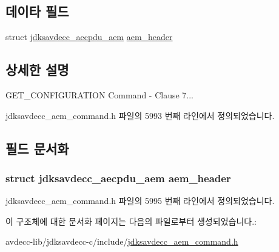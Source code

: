 \subsection*{데이타 필드}
\begin{DoxyCompactItemize}
\item 
struct \hyperlink{structjdksavdecc__aecpdu__aem}{jdksavdecc\+\_\+aecpdu\+\_\+aem} \hyperlink{structjdksavdecc__aem__command__get__configuration_ae1e77ccb75ff5021ad923221eab38294}{aem\+\_\+header}
\end{DoxyCompactItemize}


\subsection{상세한 설명}
G\+E\+T\+\_\+\+C\+O\+N\+F\+I\+G\+U\+R\+A\+T\+I\+ON Command -\/ Clause 7... 

jdksavdecc\+\_\+aem\+\_\+command.\+h 파일의 5993 번째 라인에서 정의되었습니다.



\subsection{필드 문서화}
\subsubsection[{\texorpdfstring{aem\+\_\+header}{aem_header}}]{\setlength{\rightskip}{0pt plus 5cm}struct {\bf jdksavdecc\+\_\+aecpdu\+\_\+aem} aem\+\_\+header}\hypertarget{structjdksavdecc__aem__command__get__configuration_ae1e77ccb75ff5021ad923221eab38294}{}\label{structjdksavdecc__aem__command__get__configuration_ae1e77ccb75ff5021ad923221eab38294}


jdksavdecc\+\_\+aem\+\_\+command.\+h 파일의 5995 번째 라인에서 정의되었습니다.



이 구조체에 대한 문서화 페이지는 다음의 파일로부터 생성되었습니다.\+:\begin{DoxyCompactItemize}
\item 
avdecc-\/lib/jdksavdecc-\/c/include/\hyperlink{jdksavdecc__aem__command_8h}{jdksavdecc\+\_\+aem\+\_\+command.\+h}\end{DoxyCompactItemize}
